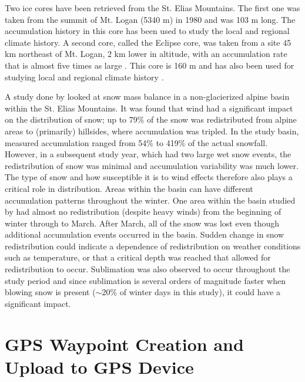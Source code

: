 \documentclass{sfuthesis}
\begin{document}
\begin{appendices}
Two ice cores have been retrieved from the St. Elias Mountains. The first one was taken from the summit of Mt. Logan (5340 m) in 1980 and was 103 m long. The accumulation history in this core has been used to study the local \citep{Holdsworth1991} and regional \citep{Moore2002} climate history. A second core, called the Eclipse core, was taken from a site 45 km northeast of Mt. Logan, 2 km lower in altitude, with an accumulation rate that is almost five times as large \citep{Wake2002}. This core is 160 m and has also been used for studying local and regional climate history \citep{Wake2002}. 

A study done by \cite{Pomeroy1999} looked at snow mass balance in a non-glacierized alpine basin within the St. Elias Mountains. It was found that wind had a significant impact on the distribution of snow; up to 79$\%$ of the snow was redistributed from alpine areas to (primarily) hillsides, where accumulation was tripled. In the study basin, measured accumulation ranged from 54$\%$ to 419$\%$ of the actual snowfall. However, in a subsequent study year, which had two large wet snow events, the redistribution of snow was minimal and accumulation variability was much lower. The type of snow and how susceptible it is to wind effects therefore also plays a critical role in distribution. Areas within the basin can have different accumulation patterns throughout the winter. One area within the basin studied by \cite{Pomeroy1999} had almost no redistribution (despite heavy winds) from the beginning of winter through to March. After March, all of the snow was lost even though additional accumulation events occurred in the basin. Sudden change in snow redistribution could indicate a dependence of redistribution on weather conditions such as temperature, or that a critical depth was reached that allowed for redistribution to occur. Sublimation was also observed to occur throughout the study period and since sublimation is several orders of magnitude faster when blowing snow is present ($\sim$20\% of winter days in this study), it could have a significant impact.


	\chapter{GPS Waypoint Creation and Upload to GPS Device}
	\label{app:GPSwaypoints}


\end{appendices}
\end{document}
